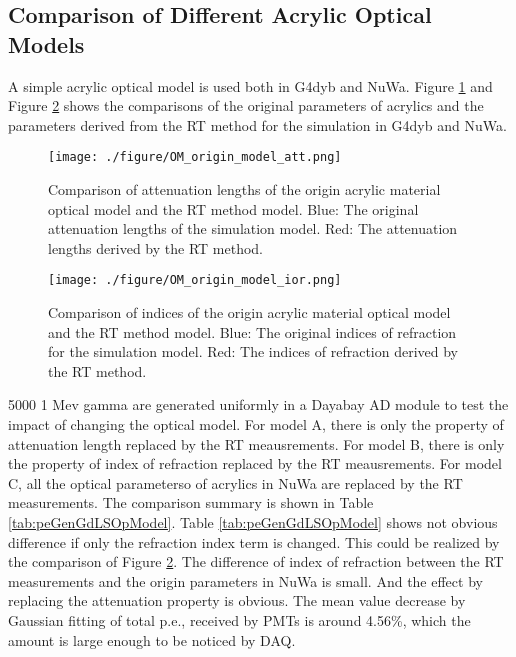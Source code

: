 \subsection{Comparison of Different Acrylic Optical Models}

A simple acrylic optical model is used both in G4dyb and NuWa. Figure \ref{fig:OM_origin_model_att.png} and
Figure \ref{fig:OM_origin_model_ior.png} shows the comparisons of the original parameters of acrylics
and the parameters derived from the RT method for the simulation in G4dyb and NuWa.


\begin{figure}
    \centering
    \texttt{[image: ./figure/OM\_origin\_model\_att.png]}
    \caption[Comparison of attenuation length of the origin acrylic material optical model and the RT method model]
{
Comparison of attenuation lengths of the origin acrylic material optical model and the RT method model.
Blue: The original attenuation lengths of the simulation model.
Red: The attenuation lengths derived by the RT method.
}
    \label{fig:OM_origin_model_att.png}
    \end{figure}

\begin{figure}
    \centering
    \texttt{[image: ./figure/OM\_origin\_model\_ior.png]}
    \caption[Comparison of indices of the origin acrylic material optical model and the RT method model]
{
Comparison of indices of the origin acrylic material optical model and the RT method model.
Blue: The original indices of refraction for the simulation model.
Red: The indices of refraction derived by the RT method.
}
    \label{fig:OM_origin_model_ior.png}
    \end{figure}


5000 1 Mev gamma are generated uniformly in a Dayabay AD module to test the impact of changing the optical model.
For model A, there is only the property of attenuation length replaced by the RT meausrements.
For model B, there is only the property of index of refraction replaced by the RT meausrements.
For model C, all the optical parameterso of acrylics in NuWa are replaced by the RT measurements.
The comparison summary is shown in Table \ref{tab:peGenGdLSOpModel}.
Table \ref{tab:peGenGdLSOpModel} shows not obvious difference if only the refraction index term is changed.
This could be realized by the comparison of Figure \ref{fig:OM_origin_model_ior.png}. The difference of index of
refraction between the RT measurements and the origin parameters in NuWa is small.
And the effect by replacing the attenuation property is obvious. The mean value decrease by Gaussian fitting of total p.e., received by PMTs
is around 4.56\%, which the amount is large enough to be noticed by DAQ.



